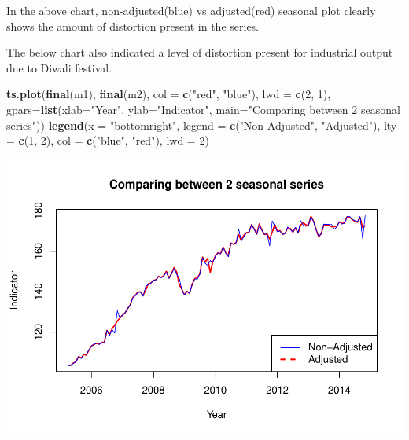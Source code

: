 \documentclass[
]{article}
\newenvironment{Shaded}{\begin{snugshade}}{\end{snugshade}}
\newcommand{\AttributeTok}[1]{\textcolor[rgb]{0.13,0.29,0.53}{#1}}
\newcommand{\DecValTok}[1]{\textcolor[rgb]{0.00,0.00,0.81}{#1}}
\newcommand{\FunctionTok}[1]{\textcolor[rgb]{0.13,0.29,0.53}{\textbf{#1}}}
\newcommand{\NormalTok}[1]{#1}
\newcommand{\StringTok}[1]{\textcolor[rgb]{0.31,0.60,0.02}{#1}}
\begin{document}
In the above chart, non-adjusted(blue) vs adjusted(red) seasonal plot
clearly shows the amount of distortion present in the series.

The below chart also indicated a level of distortion present for
industrial output due to Diwali festival.

\begin{Shaded}
\begin{Highlighting}[]
\FunctionTok{ts.plot}\NormalTok{(}\FunctionTok{final}\NormalTok{(m1), }\FunctionTok{final}\NormalTok{(m2), }\AttributeTok{col =} \FunctionTok{c}\NormalTok{(}\StringTok{"red"}\NormalTok{, }\StringTok{"blue"}\NormalTok{), }\AttributeTok{lwd =} \FunctionTok{c}\NormalTok{(}\DecValTok{2}\NormalTok{, }\DecValTok{1}\NormalTok{), }\AttributeTok{gpars=}\FunctionTok{list}\NormalTok{(}\AttributeTok{xlab=}\StringTok{"Year"}\NormalTok{, }\AttributeTok{ylab=}\StringTok{"Indicator"}\NormalTok{, }\AttributeTok{main=}\StringTok{"Comparing between 2 seasonal series"}\NormalTok{))}
\FunctionTok{legend}\NormalTok{(}\AttributeTok{x =} \StringTok{"bottomright"}\NormalTok{,          }
       \AttributeTok{legend =} \FunctionTok{c}\NormalTok{(}\StringTok{"Non{-}Adjusted"}\NormalTok{, }\StringTok{"Adjusted"}\NormalTok{),}
       \AttributeTok{lty =} \FunctionTok{c}\NormalTok{(}\DecValTok{1}\NormalTok{, }\DecValTok{2}\NormalTok{),           }
       \AttributeTok{col =} \FunctionTok{c}\NormalTok{(}\StringTok{"blue"}\NormalTok{, }\StringTok{"red"}\NormalTok{),}
       \AttributeTok{lwd =} \DecValTok{2}\NormalTok{) }
\end{Highlighting}
\end{Shaded}

\includegraphics{regressors_of_diwali_seasonality_for_industrial_production_files/figure-latex/unnamed-chunk-12-1.pdf}
\end{document}
